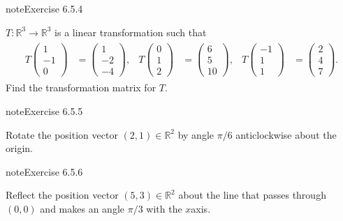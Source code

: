 \documentclass[letterpaper,10pt,english]{jupyterBook}
\begin{document}
\begin{sphinxadmonition}{note}{Exercise 6.5.4}



\sphinxAtStartPar
\(T: \mathbb{R}^3 \to \mathbb{R}^3\) is a linear transformation such that
\begin{equation*}
\begin{split} \begin{align*}
    T\begin{pmatrix} 1 \\ -1 \\ 0 \end{pmatrix} &= \begin{pmatrix} 1 \\ -2 \\ -4 \end{pmatrix}, &
    T\begin{pmatrix} 0 \\ 1 \\ 2 \end{pmatrix} &= \begin{pmatrix} 6 \\ 5 \\ 10 \end{pmatrix}, &
    T\begin{pmatrix} -1 \\ 1 \\ 1 \end{pmatrix} &= \begin{pmatrix} 2 \\ 4 \\ 7 \end{pmatrix}.
\end{align*} \end{split}
\end{equation*}
\sphinxAtStartPar
Find the transformation matrix for \(T\).
\end{sphinxadmonition}
 \label{exercise:transformations-ex-rotation}

\begin{sphinxadmonition}{note}{Exercise 6.5.5}



\sphinxAtStartPar
Rotate the position vector \((2, 1) \in \mathbb{R}^2\) by angle \(\pi/6\) anti\sphinxhyphen{}clockwise about the origin.
\end{sphinxadmonition}
 \label{exercise:transformations-ex-reflection}

\begin{sphinxadmonition}{note}{Exercise 6.5.6}



\sphinxAtStartPar
Reflect the position vector \((5, 3) \in \mathbb{R}^2\) about the line that passes through \((0, 0)\) and makes an angle \(\pi/3\) with the \(x\)\sphinxhyphen{}axis.
\end{sphinxadmonition}
 \label{exercise:transformations-ex-transform-square}
\end{document}
